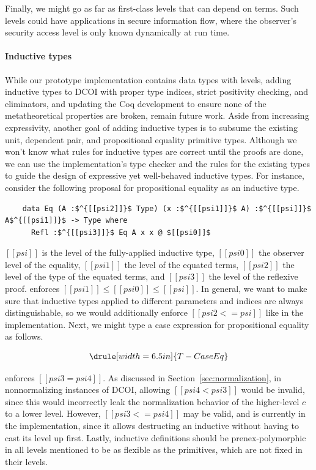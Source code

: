 \documentclass[acmsmall]{acmart}
\newcommand{\name}{DCOI\xspace}
\begin{document}
Finally, we might go as far as first-class levels that can depend on terms.
Such levels could have applications in secure information flow,
where the observer's security access level is only known dynamically at run time.
\fi

\paragraph{Inductive types}

While our prototype implementation contains data types with levels,
adding inductive types to \name{} with proper type indices, strict positivity checking, and eliminators,
and updating the Coq development to ensure none of the metatheoretical properties are broken,
remain future work.
Aside from increasing expressivity,
another goal of adding inductive types is to subsume the existing unit,
dependent pair, and propositional equality primitive types.
Although we won't know what rules for inductive types are correct until the proofs are done,
we can use the implementation's type checker and the rules for the existing types
to guide the design of expressive yet well-behaved inductive types.
\ifextended
For instance, consider the following proposal for propositional equality as an inductive type.

\begin{lstlisting}
    data Eq (A :$^{[[psi2]]}$ Type) (x :$^{[[psi1]]}$ A) :$^{[[psi]]}$ A$^{[[psi1]]}$ -> Type where
      Refl :$^{[[psi3]]}$ Eq A x x @ $[[psi0]]$
\end{lstlisting}

$[[psi]]$ is the level of the fully-applied inductive type,
$[[psi0]]$ the observer level of the equality,
$[[psi1]]$ the level of the equated terms,
$[[psi2]]$ the level of the type of the equated terms,
and $[[psi3]]$ the level of the reflexive proof.
 enforces $[[psi1]] \leq [[psi0]] \leq [[psi]]$.
In general, we want to make sure that inductive types applied to different parameters and indices
are always distinguishable, so we would additionally enforce $[[psi2 <= psi]]$ like in the implementation.
Next, we might type a case expression for propositional equality as follows.

\[ \drule[width=6.5in]{T-CaseEq} \]

 enforces $[[psi3 = psi4]]$.
As discussed in Section~\ref{sec:normalization},
in nonnormalizing instances of \name{},
allowing $[[psi4 < psi3]]$ would be invalid,
since this would incorrectly leak the normalization behavior of the higher-level $c$ to a lower level.
However, $[[psi3 <= psi4]]$ may be valid,
and is currently in the implementation,
since it allows destructing an inductive without having to cast its level up first.
\fi
Lastly, inductive definitions should be prenex-polymorphic in all levels mentioned
to be as flexible as the primitives, which are not fixed in their levels.
\end{document}
